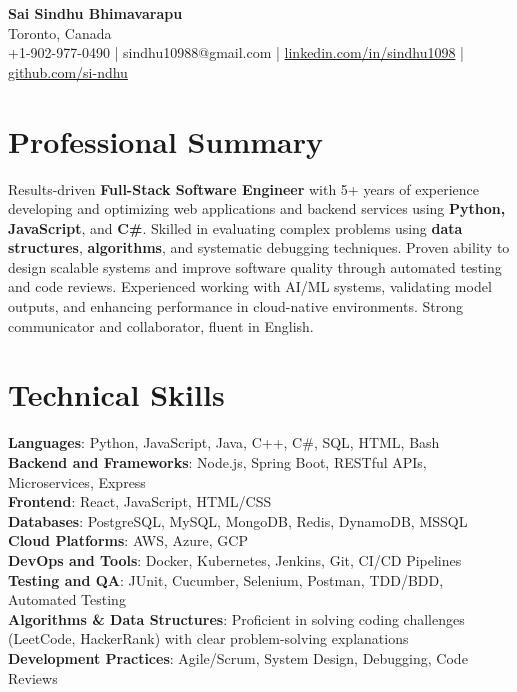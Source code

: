 \documentclass[letterpaper,11pt]{article}
\begin{document}
\begin{center}
  {\Large \textbf{Sai Sindhu Bhimavarapu}} \\
  Toronto, Canada \\
  +1-902-977-0490 \enspace | \enspace sindhu10988@gmail.com \enspace | \enspace \href{https://www.linkedin.com/in/sindhu1098/}{linkedin.com/in/sindhu1098} \enspace | \enspace \href{https://github.com/si-ndhu}{github.com/si-ndhu}
\end{center}

\section{Professional Summary}
  \begin{itemize}[leftmargin=0.15in, label={}]
    \small{\item{
     Results-driven \textbf{Full-Stack Software Engineer} with 5+ years of experience developing and optimizing web applications and backend services using \textbf{Python, JavaScript}, and \textbf{C\#}. Skilled in evaluating complex problems using \textbf{data structures}, \textbf{algorithms}, and systematic debugging techniques. Proven ability to design scalable systems and improve software quality through automated testing and code reviews. Experienced working with AI/ML systems, validating model outputs, and enhancing performance in cloud-native environments. Strong communicator and collaborator, fluent in English.
    }}
  \end{itemize}
\vspace{-16pt}

\section{Technical Skills}
 \begin{itemize}[leftmargin=0.15in, label={}]
    \small{\item{
     \textbf{Languages}: Python, JavaScript, Java, C++, C\#, SQL, HTML, Bash \\
     \textbf{Backend and Frameworks}: Node.js, Spring Boot, RESTful APIs, Microservices, Express \\
     \textbf{Frontend}: React, JavaScript, HTML/CSS \\
     \textbf{Databases}: PostgreSQL, MySQL, MongoDB, Redis, DynamoDB, MSSQL \\
     \textbf{Cloud Platforms}: AWS, Azure, GCP \\
     \textbf{DevOps and Tools}: Docker, Kubernetes, Jenkins, Git, CI/CD Pipelines \\
     \textbf{Testing and QA}: JUnit, Cucumber, Selenium, Postman, TDD/BDD, Automated Testing \\
     \textbf{Algorithms \& Data Structures}: Proficient in solving coding challenges (LeetCode, HackerRank) with clear problem-solving explanations \\
     \textbf{Development Practices}: Agile/Scrum, System Design, Debugging, Code Reviews
    }}
 \end{itemize}
\vspace{-16pt}
\end{document}
